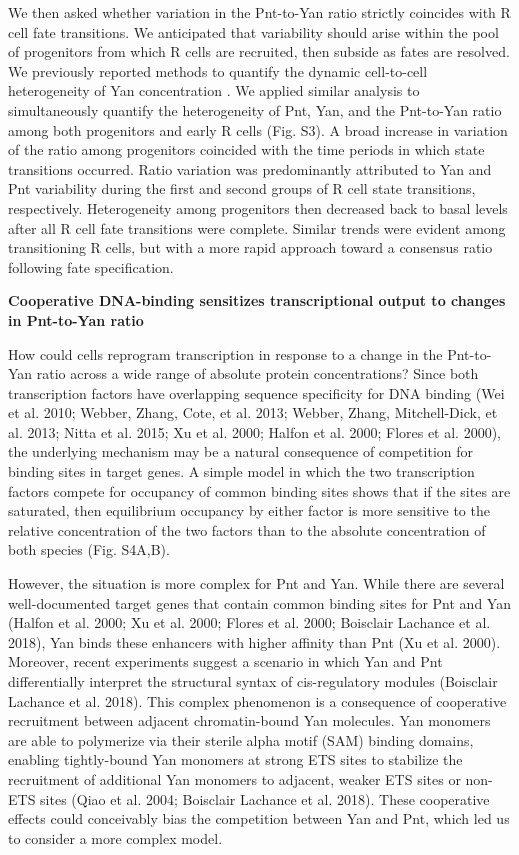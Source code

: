 We then asked whether variation in the Pnt-to-Yan ratio strictly coincides with R cell fate transitions. We anticipated that variability should arise within the pool of progenitors from which R cells are recruited, then subside as fates are resolved. We previously reported methods to quantify the dynamic cell-to-cell heterogeneity of Yan concentration \cite{Pelaez2015}. We applied similar analysis to simultaneously quantify the heterogeneity of Pnt, Yan, and the Pnt-to-Yan ratio among both progenitors and early R cells (Fig. S3). A broad increase in variation of the ratio among progenitors coincided with the time periods in which state transitions occurred. Ratio variation was predominantly attributed to Yan and Pnt variability during the first and second groups of R cell state transitions, respectively. Heterogeneity among progenitors then decreased back to basal levels after all R cell fate transitions were complete. Similar trends were evident among transitioning R cells, but with a more rapid approach toward a consensus ratio following fate specification.

\textbf{Cooperative DNA-binding sensitizes transcriptional output to changes in Pnt-to-Yan ratio }

How could cells reprogram transcription in response to a change in the Pnt-to-Yan ratio across a wide range of absolute protein concentrations? Since both transcription factors have overlapping sequence specificity for DNA binding (Wei et al. 2010; Webber, Zhang, Cote, et al. 2013; Webber, Zhang, Mitchell-Dick, et al. 2013; Nitta et al. 2015; Xu et al. 2000; Halfon et al. 2000; Flores et al. 2000), the underlying mechanism may be a natural consequence of competition for binding sites in target genes. A simple model in which the two transcription factors compete for occupancy of common binding sites shows that if the sites are saturated, then equilibrium occupancy by either factor is more sensitive to the relative concentration of the two factors than to the absolute concentration of both species (Fig. S4A,B).

However, the situation is more complex for Pnt and Yan. While there are several well-documented target genes that contain common binding sites for Pnt and Yan (Halfon et al. 2000; Xu et al. 2000; Flores et al. 2000; Boisclair Lachance et al. 2018), Yan binds these enhancers with higher affinity than Pnt (Xu et al. 2000). Moreover, recent experiments suggest a scenario in which Yan and Pnt differentially interpret the structural syntax of cis-regulatory modules (Boisclair Lachance et al. 2018). This complex phenomenon is a consequence of cooperative recruitment between adjacent chromatin-bound Yan molecules. Yan monomers are able to polymerize via their sterile alpha motif (SAM) binding domains, enabling tightly-bound Yan monomers at strong ETS sites to stabilize the recruitment of additional Yan monomers to adjacent, weaker ETS sites or non-ETS sites (Qiao et al. 2004; Boisclair Lachance et al. 2018). These cooperative effects could conceivably bias the competition between Yan and Pnt, which led us to consider a more complex model.

